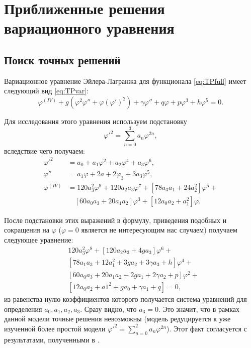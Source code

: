 
\chapter{Приближенные решения вариационного уравнения}\label{ch:solution}

\section{Поиск точных решений}\label{sec:exact}
Вариационное уравнение Эйлера-Лагранжа для функционала \eqref{eq:TPfull} имеет следующий вид \eqref{eq:TPvar}:
\begin{equation*}
\varphi^{(IV)} + 
g\left(\varphi^2\varphi'' + \varphi\left(\varphi'\right)^2\right) +
\gamma\varphi'' + q\varphi + p\varphi^3 + h\varphi^5 = 0.
\label{eq:TPvar_}
\end{equation*}

Для исследования этого уравнения используем подстановку
\begin{equation}
\varphi'^2 = \sum_{n=0}^3 a_n \varphi^{2n},
\label{eq:subst3}
\end{equation}
вследствие чего получаем:
\begin{equation}
\begin{aligned}
\varphi'^2 &= a_0 + a_1\varphi^2 + a_2\varphi^4 + a_3\varphi^6,\\
\varphi'' &= a_1\varphi + 2a+2\varphi_3 + 3a_3\varphi^5, \\
\varphi^{(IV)} &= 120a_3^2\varphi^9 + 120a_2a_3\varphi^7 + 
\left[78a_3a_1 + 24a_2^2\right]\varphi^5 + \\
&\quad\left[60a_0a_3 + 20a_1a_2\right]\varphi^3 +  
\left[12a_0a_2+a_1^2\right]\varphi.
\end{aligned}
\end{equation}

После подстановки этих выражений в формулу, приведения подобных и сокращения на  $\varphi$ ($\varphi = 0$ является не интересующим нас случаем) получаем следующее уравнение:
\begin{equation}\label{}
\begin{aligned}
&120a_3^2\varphi^8 + \left[120a_2a_3 + 4ga_3\right]\varphi^6 + \\
&\left[78a_1a_3 + 12a_1^2 + 3ga_2 + 3\gamma a_3 +h\right]\varphi^4 + \\
&\left[60a_0a_3 + 20a_1a_2 + 2ga_1 + 2\gamma a_2 + p\right]\varphi^2 + \\
&\left[12a_0a_2 + a1^2 + ga_0 + \gamma a_1 + q\right] = 0,
\end{aligned}
\end{equation}
из равенства нулю коэффициентов которого получается система уравнений для определения $a_0, a_1, a_2, a_3$. Сразу видно, что $a_3=0$. Это значит, что в рамках данной модели точные решения невозможны (модель редуцируется к уже изученной более простой модели $\varphi'^2 = \sum_{n=0}^2 a_n \varphi^{2n}$). Этот факт согласуется с результатами, полученными в \cite{Berezovsky1998}.

